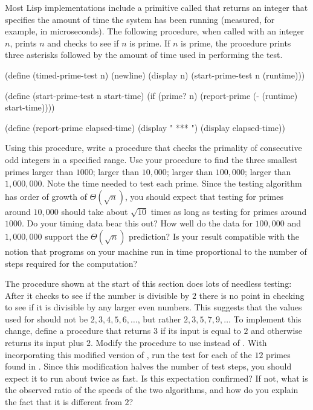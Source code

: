 \begin{exercise}
	\label{Exercise 1.22}
	Most Lisp implementations include a primitive called  that returns an integer that specifies the amount of time the system has been running (measured, for example, in microseconds).
	The following  procedure, when called with an integer \( n \), prints \( n \) and checks to see if \( n \) is prime.
	If \( n \) is prime, the procedure prints three asterisks followed by the amount of time used in performing the test.
	\begin{scheme}
	  (define (timed-prime-test n)
	    (newline)
	    (display n)
	    (start-prime-test n (runtime)))

	  (define (start-prime-test n start-time)
	    (if (prime? n)
	        (report-prime (- (runtime) start-time))))

	  (define (report-prime elapsed-time)
	    (display " *** ")
	    (display elapsed-time))
	\end{scheme}
	Using this procedure, write a procedure  that checks the primality of consecutive odd integers in a specified range.
	Use your procedure to find the three smallest primes larger than \( 1000 \);
	larger than \( 10,000 \);
	larger than \( 100,000 \);
	larger than \( 1,000,000 \).
	Note the time needed to test each prime.
	Since the testing algorithm has order of growth of \( Θ(\sqrt{n}) \), you should expect that testing for primes around \( 10,000 \) should take about \( \sqrt{10} \) times as long as testing for primes around \( 1000 \).
	Do your timing data bear this out?
	How well do the data for \( 100,000 \) and \( 1,000,000 \) support the \( Θ(\sqrt{n}) \) prediction?
	Is your result compatible with the notion that programs on your machine run in time proportional to the number of steps required for the computation?
\end{exercise}



\begin{exercise}
	\label{Exercise 1.23}
	The  procedure shown at the start of this section does lots of needless testing:
	After it checks to see if the number is divisible by \( 2 \) there is no point in checking to see if it is divisible by any larger even numbers.
	This suggests that the values used for  should not be \( 2, 3, 4, 5, 6, \dotsc \), but rather \( 2, 3, 5, 7, 9, \dotsc \)
	To implement this change, define a procedure  that returns \( 3 \) if its input is equal to \( 2 \) and otherwise returns its input plus \( 2 \).
	Modify the  procedure to use  instead of .
	With  incorporating this modified version of , run the test for each of the \( 12 \) primes found in .
	Since this modification halves the number of test steps, you should expect it to run about twice as fast.
	Is this expectation confirmed?
	If not, what is the observed ratio of the speeds of the two algorithms, and how do you explain the fact that it is different from \( 2 \)?
\end{exercise}




